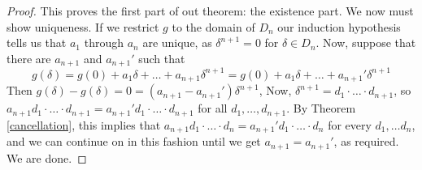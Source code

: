\documentclass[]{book}
\begin{document}
\begin{proof}
  This proves the first part of out theorem: the existence part. We now must show uniqueness. If we restrict $g$ to the domain of $D_n$ our induction hypothesis tells us that $a_1$ through $a_n$ are unique, as $\delta^{n+1} = 0$ for $\delta \in D_n$. Now, suppose that there are $a_{n+1}$ and $a_{n+1}'$ such that
  \[ g(\delta) = g(0) + a_1\delta + \ldots + a_{n+1}\delta^{n+1} = g(0) + a_1\delta + \ldots + a_{n+1}'\delta^{n+1} \]
  Then $g(\delta) - g(\delta) = 0 = (a_{n+1}-a_{n+1}')\delta^{n+1}$, Now, $\delta^{n+1} = d_1\cdot\ldots\cdot d_{n+1}$, so $a_{n+1}d_1\cdot\ldots\cdot d_{n+1} = a_{n+1}'d_1\cdot\ldots\cdot d_{n+1}$ for all $d_1, \ldots, d_{n+1}$. By Theorem \ref{cancellation}, this implies that $a_{n+1}d_1\cdot\ldots\cdot d_n = a_{n+1}'d_1\cdot\ldots\cdot d_n$ for every $d_1, \ldots d_n$, and we can continue on in this fashion until we get $a_{n+1} = a_{n+1}'$, as required. We are done.

\end{proof}
\end{document}
